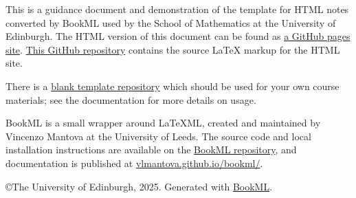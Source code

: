 \documentclass[12pt,oneside]{book}
\begin{document}


\maketitle

This is a guidance document and demonstration of the template for HTML notes converted by BookML used by the School of Mathematics at the University of Edinburgh. The HTML version of this document can be found as \href{https://uoe-school-of-mathematics.github.io/Workflow-Documentation/index.html}{a GitHub pages site}. \href{https://github.com/UoE-School-of-Mathematics/Workflow-Documentation}{This GitHub repository} contains the source LaTeX markup for the HTML site.

There is a \href{https://github.com/UoE-School-of-Mathematics/Workflow-Template-Blank}{blank template repository} which should be used for your own course materials; see the documentation for more details on usage.

BookML is a small wrapper around LaTeXML, created and maintained by Vincenzo Mantova at the University of Leeds. The source code and local installation instructions are available on the \href{https://github.com/vlmantova/bookml}{BookML repository}, and documentation is published at \href{https://vlmantova.github.io/bookml/}{vlmantova.github.io/bookml/}.


\tableofcontents




\iflatexml
    \copyright The University of Edinburgh, 2025. Generated with \href{https://vlmantova.github.io/bookml/}{BookML}.
\fi


% 

\mainmatter



\end{document}
